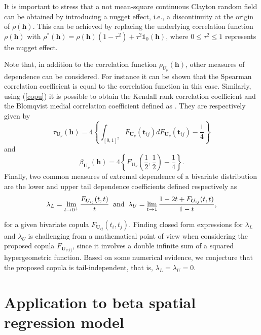 \documentclass[times,sort&compress,3p]{elsarticle}
\theoremstyle{plain}%
\theoremstyle{definition}
\def\UU{\bm{U}}
\def\hh{\bm{h}}
\begin{document}
It is important to stress that a not mean-square continuous   Clayton random field
 can be obtained by introducing a nugget effect, i.e.,
a discontinuity at the origin of $\rho(\hh)$.
 This can be achieved by replacing the underlying
correlation function $\rho(\hh)$ with $\rho^*(\hh) = \rho(\hh)(1-\tau^2)+\tau^2 \mathbb{1}_0(\hh)$, where $0 \leq \tau^2 \leq1$
 represents
the  nugget effect.



Note that, in addition to the correlation function $\rho_{U_{\nu}}(\hh)$, other measures of dependence can be considered.
For instance it can be shown that  the Spearman correlation coefficient is equal to the correlation function in this case. Similarly, using (\ref{copu}) it is possible to obtain the Kendall rank correlation coefficient and the Blomqvist medial correlation coefficient defined as \citep{Genest1986,nelsen2007introduction}. They are respectively given by
\begin{equation*}\label{kendall}
\tau_{\UU_{\nu}}(\hh)=4\left\{\int_{[0,1]^2}F_{\UU_{\nu}}(\mathbf{t}_{ij})dF_{\UU_{\nu}}(\mathbf{t}_{ij})-\dfrac{1}{4}\right\}
\end{equation*}
and
\begin{equation*}\label{blomqvist}
\beta_{\UU_{\nu}}(\hh)=4\left\{F_{\UU_{\nu}}\left(\dfrac{1}{2},\dfrac{1}{2}\right)-\dfrac{1}{4}\right\}.
\end{equation*}
Finally, two common measures
 of extremal dependence  of a bivariate distribution
 are the lower and upper tail  dependence coefficients \citep{Sibuya:1960,Joe:2014} defined respectively as
$$\lambda_L=\lim\limits_{t \to 0^+} \frac{F_{\UU_{ij}}(t,t)}{t}\;\;\hbox{and}\;\;\lambda_U=\lim\limits_{t \to 1} \frac{1-2t+F_{\UU_{ij}}(t,t)}{1-t},$$

\noindent for a given bivariate copula $F_{\UU_{ij}}(t_{i},t_j)$.
Finding closed form expressions  for
$\lambda_L$ and $\lambda_U$ is challenging from a mathematical point of view when considering the proposed copula  $F_{\UU_{\nu;ij}}$,
since  it involves  a double infinite sum  of a  squared hypergeometric function. Based on some numerical evidence, we conjecture that the proposed copula is tail-independent, that is, $\lambda_L=\lambda_U=0$.




\section{Application to  beta spatial regression model}\label{sec:4}
\end{document}

